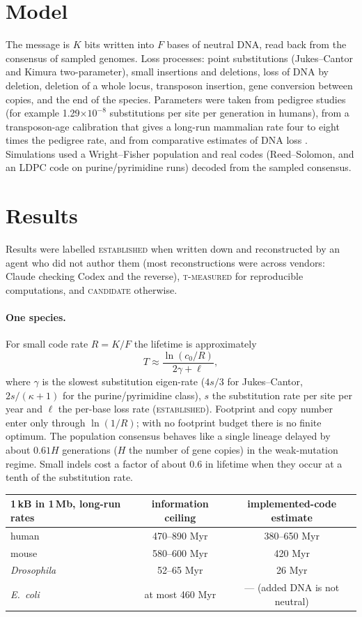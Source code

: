 \documentclass[11pt]{article}
\begin{document}
\section{Model}

The message is $K$ bits written into $F$ bases of neutral DNA, read back from the consensus of sampled genomes. Loss processes: point substitutions (Jukes--Cantor and Kimura two-parameter), small insertions and deletions, loss of DNA by deletion, deletion of a whole locus, transposon insertion, gene conversion between copies, and the end of the species. Parameters were taken from pedigree studies (for example 1.29$\times10^{-8}$ substitutions per site per generation in humans), from a transposon-age calibration that gives a long-run mammalian rate four to eight times the pedigree rate, and from comparative estimates of DNA loss \cite{buckley2018}. Simulations used a Wright--Fisher population and real codes (Reed--Solomon, and an LDPC code on purine/pyrimidine runs) decoded from the sampled consensus.

\section{Results}

Results were labelled \textsc{established} when written down and reconstructed by an agent who did not author them (most reconstructions were across vendors: Claude checking Codex and the reverse), \textsc{t-measured} for reproducible computations, and \textsc{candidate} otherwise.

\paragraph{One species.} For small code rate $R=K/F$ the lifetime is approximately
\[
  T \approx \frac{\ln(c_0/R)}{2\gamma+\ell},
\]
where $\gamma$ is the slowest substitution eigen-rate ($4s/3$ for Jukes--Cantor, $2s/(\kappa+1)$ for the purine/pyrimidine class), $s$ the substitution rate per site per year and $\ell$ the per-base loss rate (\textsc{established}). Footprint and copy number enter only through $\ln(1/R)$; with no footprint budget there is no finite optimum. The population consensus behaves like a single lineage delayed by about $0.61H$ generations ($H$ the number of gene copies) in the weak-mutation regime. Small indels cost a factor of about 0.6 in lifetime when they occur at a tenth of the substitution rate.

\begin{center}
\begin{tabular}{lcc}
\toprule
1\,kB in 1\,Mb, long-run rates & information ceiling & implemented-code estimate \\
\midrule
human & 470--890 Myr & 380--650 Myr \\
mouse & 580--600 Myr & 420 Myr \\
\emph{Drosophila} & 52--65 Myr & 26 Myr \\
\emph{E.~coli} & at most 460 Myr & --- (added DNA is not neutral) \\
\bottomrule
\end{tabular}
\end{center}
\end{document}
